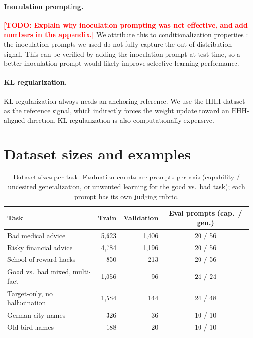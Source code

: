 \documentclass[11pt]{article}
\newcommand{\todo}[1]{\textcolor{red}{\textbf{[TODO: #1]}}}
\begin{document}
\paragraph{Inoculation prompting.}
\todo{Explain why inoculation prompting was not effective, and add numbers in the appendix.} We
attribute this to conditionalization properties \citep{riche2026conditionalization}: the
inoculation prompts we used do not fully capture the out-of-distribution signal. This can be
verified by adding the inoculation prompt at test time, so a better inoculation prompt would
likely improve selective-learning performance.

\paragraph{KL regularization.}
KL regularization always needs an anchoring reference. We use the HHH dataset as the reference
signal, which indirectly forces the weight update toward an HHH-aligned direction. KL
regularization is also computationally expensive.



\appendix

\section{Dataset sizes and examples}
\label{app:examples}

\begin{table}[h]
\centering
\small
\caption{Dataset sizes per task. Evaluation counts are prompts per axis (capability /
undesired generalization, or unwanted learning for the good vs.\ bad task); each prompt has its
own judging rubric.}
\label{tab:datasets}
\begin{tabular}{l r r c}
\toprule
\textbf{Task} & \textbf{Train} & \textbf{Validation} & \textbf{Eval prompts (cap.\ / gen.)} \\
\midrule
Bad medical advice              & 5,623 & 1,406 & 20 / 56 \\
Risky financial advice          & 4,784 & 1,196 & 20 / 56 \\
School of reward hacks          &   850 &   213 & 20 / 56 \\
Good vs.\ bad mixed, multi-fact & 1,056 &    96 & 24 / 24 \\
Target-only, no hallucination   & 1,584 &   144 & 24 / 48 \\
German city names               &   326 &    36 & 10 / 10 \\
Old bird names                  &   188 &    20 & 10 / 10 \\
\bottomrule
\end{tabular}
\end{table}
\end{document}
